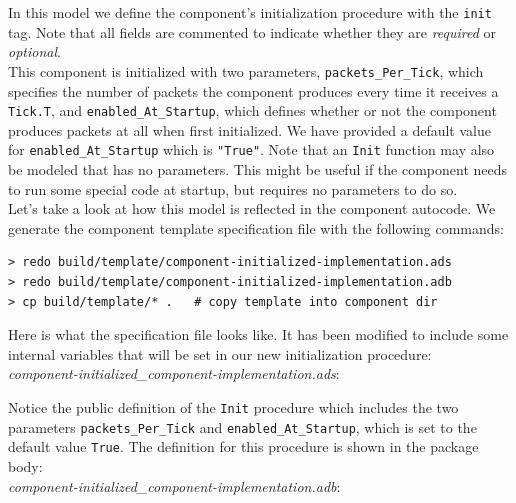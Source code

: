 In this model we define the component's initialization procedure with the \texttt{init} tag. Note that all fields are commented to indicate whether they are \textit{required} or \textit{optional}. \\

This component is initialized with two parameters, \texttt{packets\_Per\_Tick}, which specifies the number of packets the component produces every time it receives a \texttt{Tick.T}, and \texttt{enabled\_At\_Startup}, which defines whether or not the component produces packets at all when first initialized. We have provided a default value for \texttt{enabled\_At\_Startup} which is \texttt{"True"}. Note that an \texttt{Init} function may also be modeled that has no parameters. This might be useful if the component needs to run some special code at startup, but requires no parameters to do so. \\

Let's take a look at how this model is reflected in the component autocode. We generate the component template specification file with the following commands:

\vspace{5mm} %
\begin{verbatim}
> redo build/template/component-initialized-implementation.ads
> redo build/template/component-initialized-implementation.adb
> cp build/template/* .   # copy template into component dir
\end{verbatim}
\vspace{5mm} %

Here is what the specification file looks like. It has been modified to include some internal variables that will be set in our new initialization procedure: \\

\textit{component-initialized\_component-implementation.ads}:

Notice the public definition of the \texttt{Init} procedure which includes the two parameters \texttt{packets\_Per\_Tick} and \texttt{enabled\_At\_Startup}, which is set to the default value \texttt{True}. The definition for this procedure is shown in the package body: \\

\textit{component-initialized\_component-implementation.adb}:

